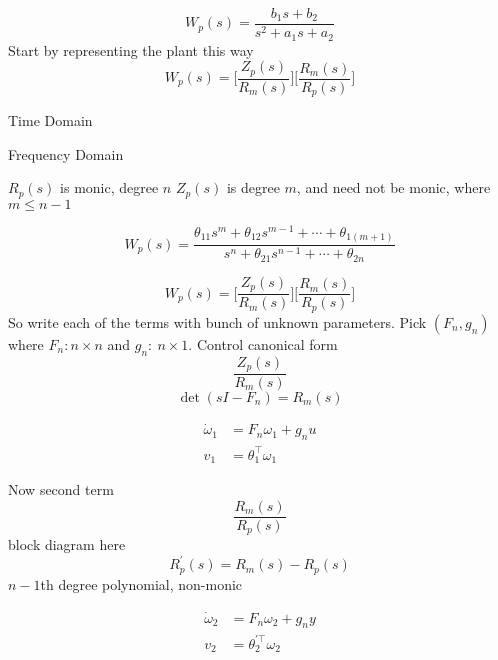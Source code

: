 \begin{equation*}
  W_{p}(s)=
  \frac{b_{1}s+b_{2}}{s^{2}+a_{1}s+a_{2}}
\end{equation*}
Start by representing the plant this way
\begin{equation*}
  W_{p}(s)=\biggr[\frac{Z_{p}(s)}{R_{m}(s)}\biggr]\biggr[\frac{R_{m}(s)}{R_{p}(s)}\biggr]
\end{equation*}

Time Domain

Frequency Domain

$R_{p}(s)$ is monic, degree $n$
$Z_{p}(s)$ is degree $m$, and need not be monic, where $m\leq n-1$

\begin{equation*}
  W_{p}(s)=\frac{\theta_{11}s^{m}+\theta_{12}s^{m-1}+\cdots+\theta_{1(m+1)}}{s^{n}+\theta_{21}s^{n-1}+\cdots+\theta_{2n}}
\end{equation*}

\begin{equation*}
  W_{p}(s)=\biggr[\frac{Z_{p}(s)}{R_{m}(s)}\biggr]\biggr[\frac{R_{m}(s)}{R_{p}(s)}\biggr]
\end{equation*}
So write each of the terms with bunch of unknown parameters.
Pick $(F_{n},g_{n})$ where $F_{n}:n\times n$ and $g_{n}:\ n\times1$.
Control canonical form
\begin{equation*}
  \frac{Z_{p}(s)}{R_{m}(s)}
\end{equation*}
\begin{equation*}
  \det(sI-F_{n})=R_{m}(s)
\end{equation*}

\begin{align*}
  \dot{\omega}_{1}&=F_{n}\omega_{1}+g_{n}u \\
  v_{1}&=\theta_{1}^{\top}\omega_{1}
\end{align*}

Now second term
\begin{equation*}
  \frac{R_{m}(s)}{R_{p}(s)}
\end{equation*}
block diagram here
\begin{equation*}
  R_{p}^{\prime}(s)=R_{m}(s)-R_{p}(s)
\end{equation*}
$n-1$th degree polynomial, non-monic

\begin{align*}
  \dot{\omega}_{2}&=F_{n}\omega_{2}+g_{n}y \\
  v_{2}&=\theta_{2}^{\prime\top}\omega_{2}
\end{align*}

